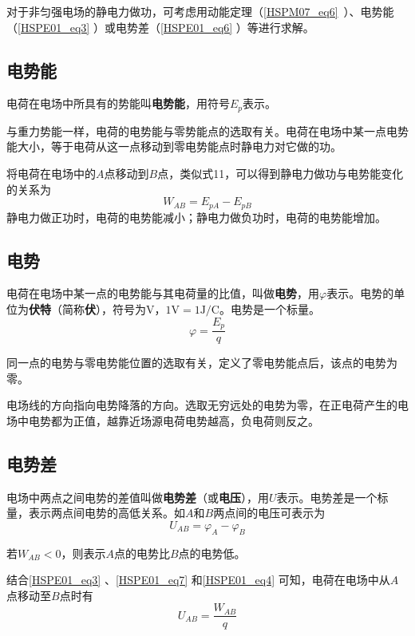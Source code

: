 对于非匀强电场的静电力做功，可考虑用动能定理（\autoref{HSPM07_eq6}~）、电势能（\autoref{HSPE01_eq3} ）或电势差（\autoref{HSPE01_eq6} ）等进行求解。

\subsection{电势能}

电荷在电场中所具有的势能叫\textbf{电势能}，用符号$E_p$表示。

与重力势能一样，电荷的电势能与零势能点的选取有关。电荷在电场中某一点电势能大小，等于电荷从这一点移动到零电势能点时静电力对它做的功。

将电荷在电场中的$A$点移动到$B$点，类似式11，可以得到静电力做功与电势能变化的关系为
\begin{equation}\label{HSPE01_eq3}
W_{AB}=E_{pA}-E_{pB}
\end{equation}
静电力做正功时，电荷的电势能减小；静电力做负功时，电荷的电势能增加。

\subsection{电势}

电荷在电场中某一点的电势能与其电荷量的比值，叫做\textbf{电势}，用$\varphi$表示。电势的单位为\textbf{伏特}（简称\textbf{伏}），符号为$\mathrm{V}$，$1\mathrm{V}=1\mathrm{J/C}$。电势是一个标量。
\begin{equation}\label{HSPE01_eq7}
\varphi = \frac{E_p}{q}
\end{equation}

同一点的电势与零电势能位置的选取有关，定义了零电势能点后，该点的电势为零。

电场线的方向指向电势降落的方向。选取无穷远处的电势为零，在正电荷产生的电场中电势都为正值，越靠近场源电荷电势越高，负电荷则反之。

\subsection{电势差}

电场中两点之间电势的差值叫做\textbf{电势差}（或\textbf{电压}），用$U$表示。电势差是一个标量，表示两点间电势的高低关系。如$A$和$B$两点间的电压可表示为
\begin{equation}\label{HSPE01_eq4}
U_{AB}=\varphi_A - \varphi_B
\end{equation}

若$W_{AB} < 0$，则表示$A$点的电势比$B$点的电势低。

结合\autoref{HSPE01_eq3} 、\autoref{HSPE01_eq7} 和\autoref{HSPE01_eq4} 可知，电荷在电场中从$A$点移动至$B$点时有
\begin{equation}\label{HSPE01_eq6}
U_{AB} = \frac{W_{AB}}{q}
\end{equation}

